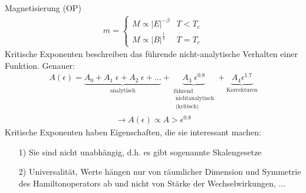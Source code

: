 \documentclass[12pt]{article}
\begin{document}
Magnetisierung (OP) \begin{align}
m= \begin{cases}
M \propto \vert E \vert ^{-\beta} & T<T_c \\
M \propto \vert B \vert ^\frac{1}{\delta} & T=T_c
\end{cases}
\end{align}
Kritische Exponenten beschreiben das führende nicht-analytische Verhalten einer Funktion. Genauer:
\begin{align*}
A(\epsilon)= 
\underbrace{ A_0 + A_1\;  \epsilon + A_2 \; \epsilon +...}_\text{analytisch} 
+ \underbrace{ A_3 \; \epsilon^{0.8}}_{\substack{ \text{führend} \\ \text{ nichtanalytisch} \\ \text{ (kritisch)} }}
+ \underbrace{ A_4 \epsilon^{1.7}}_\text{Korrekturen}
\end{align*}
\begin{align*}
\to A(\epsilon ) \propto A > \epsilon^{0.8}
\end{align*}
Kritische Exponenten haben Eigenschaften, die sie interessant machen:
\begin{enumerate}
\item[1)] Sie sind nicht unabhängig, d.h. es gibt sogenannte Skalengesetze %
\item[2)] Universalität, Werte hängen nur von räumlicher Dimension und Symmetrie des Hamiltonoperators ab und nicht von Stärke der Wechselwirkungen, ...
\end{enumerate}
\end{document}
